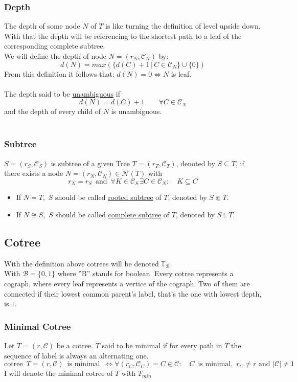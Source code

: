\documentclass[a4paper,12pt]{article}
\theoremstyle{definition}
\begin{document}
		\subsubsection{Depth}
		The depth of some node $N$ of $T$ is like turning the definition of level upside down. With that the depth will be referencing to the shortest path to a leaf of the corresponding complete subtree.\\
		We will define the depth of node $N=(r_N,\mathcal{C}_N)$ by:
		\[d(N)= max\left(\{d(C)+1\,\vert\, C\in\mathcal{C}_N\} \cup \{0\}\right)\]
		From this definition it follows that: $d(N)=0 \Leftrightarrow N$ is leaf.\\\\
		The depth said to be \underline{unambiguous} if \[d(N)=d(C) + 1\qquad \forall C\in\mathcal{C}_N\] 
		and the depth of every child of $N$ is unambiguous.\\\\
		\subsubsection{Subtree}

			$S=(r_S,\mathcal{C}_S)$ is subtree of a given Tree $T=(r_T,\mathcal{C}_T)$, denoted by $S\subseteq T$, if there exists a node $N=(r_N,\mathcal{C}_N)\in \mathcal{N}(T)$ with \[r_N=r_S\,\text{ and }\, \forall K\in \mathcal{C}_S\,\exists C\in  \mathcal{C}_N:\quad   K\subseteq C\]
			\begin{itemize}
				\item	If $N = T$, $\,S$ should be called \underline{rooted subtree} of $T$, denoted by $S\Subset T$.
				\item 	If $N \cong S$, $\,S$ should be called \underline{complete subtree}  of $T$, denoted by $S\subseteqq T$.\\
			\end{itemize}
			
	\subsection{Cotree}
	With the definition above cotrees will be denoted $\mathds{T}_{\mathcal{B}}$\\
	With $\mathcal{B}=\{0,1\}$ where ''B'' stands for boolean.
	Every cotree represents a cograph, where every leaf represents a vertice of the cograph. Two of them are connected if their lowest common parent's label, that's the one with lowest depth, is $1$. 
	\subsubsection{Minimal Cotree}
	Let $T=(r,\mathcal{C})$ be a cotree. $T$ said to be minimal if for every path in $T$ the sequence of label is always an alternating one.\\
	\[\text{cotree }\, T=(r,\mathcal{C}) \,\text{ is minimal }\, \Longleftrightarrow \forall (r_C,\mathcal{C}_C)=C\in\mathcal{C}:\quad C \,\text{ is minimal, }\, r_C \not = r \text{ and } |\mathcal{C}|\not = 1 \]
	I will denote the minimal cotree of $T$ with $T_{min}$
	
\end{document}

